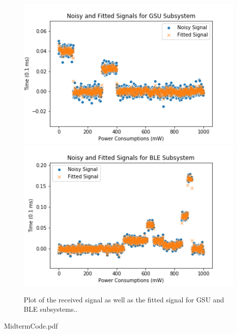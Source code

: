 \documentclass[12pt]{exam}
\begin{document}
\begin{figure}[!ht]
\includegraphics[scale=0.6]{gsu_subsystem_plot.png}
\includegraphics[scale=0.6]{ble_subsystem_plot.png}
\caption{Plot of the received signal as well as the fitted signal for GSU and BLE subsystems..}
\label{fig:signal_and_fit_curves}
\end{figure}

  
  {MidtermCode.pdf}
\end{document}

